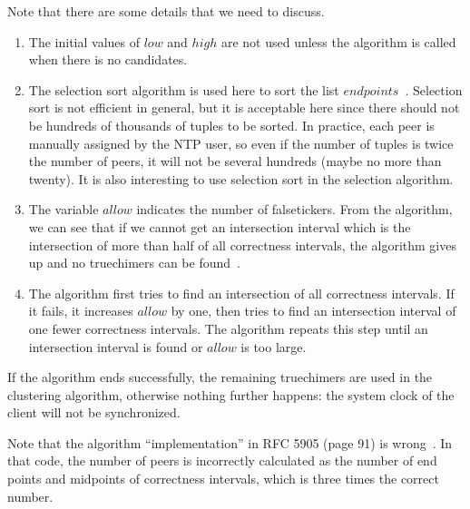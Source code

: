 Note that there are some details that we need to discuss. 
\begin{enumerate}
    \item 
        The initial values of $low$ and $high$ are not used unless the
        algorithm is called when there is no candidates.
    \item 
        The selection sort algorithm is used here to sort the list
        $endpoints$~\cite{source_code}. Selection sort is not efficient in
        general, but
        it is acceptable here since there should not be hundreds of thousands
        of tuples to be sorted. In practice, each peer is manually assigned by
        the NTP user, so even if the number of tuples is twice the
        number of peers, it will not be several hundreds (maybe no more than
        twenty). It is also interesting to use selection sort in the selection
        algorithm.
    \item
        The variable $allow$ indicates the number of falsetickers. From the
        algorithm, we can see that if we cannot get an intersection interval
        which is the intersection of more than half of all correctness intervals,
        the algorithm gives up and no truechimers can be
        found~\cite{clock_selection}.
    \item
        The algorithm first tries to find an intersection of all correctness
        intervals. If it fails, it increases $allow$ by one, then tries to find
        an intersection interval of one fewer correctness intervals. The
        algorithm
        repeats this step until an intersection interval is found or $allow$
        is too large.
\end{enumerate}
If the algorithm ends successfully, the remaining truechimers are used in the
clustering algorithm, otherwise nothing further happens: the system clock of
the client will not be synchronized.

Note that the algorithm ``implementation'' in RFC 5905 (page 91) is 
wrong~\cite{rfc5905}. In that code, the number of peers is incorrectly
calculated as the number of end points and midpoints of correctness intervals,
which is three times the correct number.


